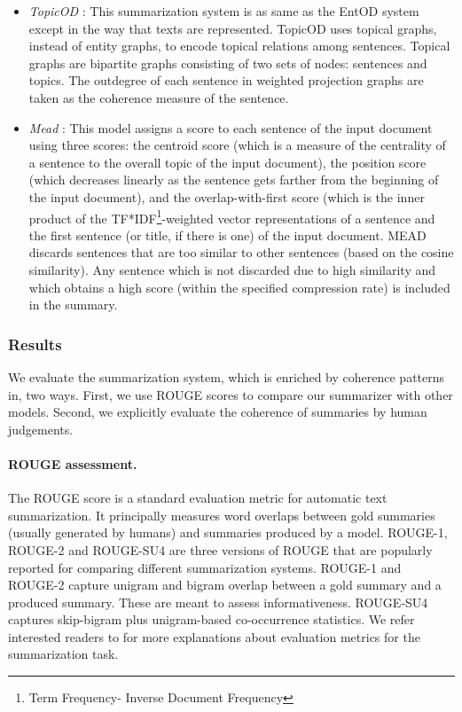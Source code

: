 \begin{itemize}
	\item \emph{TopicOD} \cite{parveen15b}: 
	This summarization system is as same as the EntOD system except in the way that texts are represented. 
	TopicOD uses topical graphs, instead of entity graphs, to encode topical relations among sentences. 
	Topical graphs are bipartite graphs consisting of two sets of nodes: sentences and topics. 
	The outdegree of each sentence in weighted projection graphs are taken as the coherence measure of the sentence.

	\item \emph{Mead} \cite{radev04b}: This model assigns a score to each sentence of the input document using three scores: the centroid score (which is a measure of the centrality of a sentence to the overall topic of the input document), the position score (which decreases linearly as the sentence gets farther from the beginning of the input document), and the \mbox{overlap-with-first} score (which is the inner product of the TF*IDF\footnote{Term Frequency- Inverse Document Frequency}-weighted vector representations of a sentence and the first sentence (or title, if there is one) of the input document. 
	MEAD discards sentences that are too similar to other sentences (based on the cosine similarity). 
	Any sentence which is not discarded due to high similarity and which obtains a high score (within the specified compression rate) is included in the summary. 
	
\end{itemize}


\subsubsection{Results }
We evaluate the summarization system, which is enriched by coherence patterns in, two ways. 
First, we use ROUGE scores to compare our summarizer with other models. 
Second, we explicitly evaluate the coherence of summaries by human judgements.

\paragraph{ROUGE assessment.}
The ROUGE score \cite{linchinyew04} is a standard evaluation metric for automatic text summarization. 
It principally measures word overlaps between gold summaries (usually generated by humans) and summaries produced by a model. 
ROUGE-1, ROUGE-2 and ROUGE-SU4 are three versions of ROUGE that are popularly reported for comparing different summarization systems. 
ROUGE-1 and ROUGE-2 capture unigram and bigram overlap between a gold summary and a produced summary. 
These are meant to assess informativeness. 
ROUGE-SU4 captures skip-bigram plus unigram-based co-occurrence statistics. 
We refer interested readers to   for more explanations about evaluation metrics for the summarization task. 

